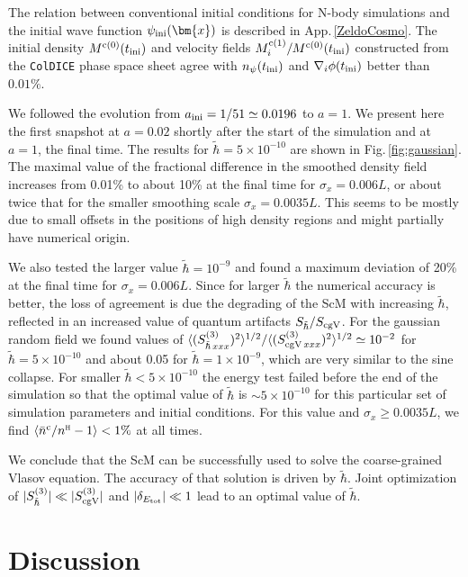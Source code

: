 \documentclass[twocolumn, nofootinbib, showpacs, superscriptaddress]{revtex4-1}
\renewcommand{\H}[0]{{\textsc{h}}}
\newcommand{\sigx}{{\sigma_{\! x}}}
\newcommand{\thbar}{\tilde\hbar}
\renewcommand{\c}[0]{{\rm{c}}}
\newcommand{\vx}[0]{\bm{x} }
\begin{document}
The relation between conventional initial conditions for N-body simulations and the initial wave function $\psi_{\rm ini}(\vx)$ is 
described in App.\,\ref{ZeldoCosmo}.  The initial density $M^{\c(0)}(t_{\rm ini})$ and velocity fields $M^{\c(1)}_i/M^{\c(0)}(t_{\rm ini})$ 
constructed from the \texttt{ColDICE} phase space sheet agree with $n_\psi(t_{\rm ini})$ and $\nabla_i \phi(t_{\rm ini})$ better than $0.01\%$.

We followed the evolution from $a_{\rm ini}=1/51\simeq 0.0196$ to $a=1$. We present here the first snapshot at $a=0.02$ shortly after the start
 of the simulation and at $a=1$, the final time.  The results for $\thbar=5\times10^{-10}$ are shown in Fig.\,\ref{fig:gaussian}.
The maximal value of the fractional difference in the smoothed density field increases from 0.01\% to about 10\% at the final time for $\sigx=0.006 L$, or about twice that 
for the smaller smoothing scale $\sigx=0.0035 L$. This seems to be mostly due to small offsets in the positions of high density regions and might partially 
have numerical origin. 

We also tested the larger value $\thbar=10^{-9}$ and found a maximum deviation of 20\% at the final time for $\sigx=0.006 L$. 
Since for larger $\thbar$ the numerical accuracy is better, the loss of agreement is due the degrading of the ScM with increasing $\thbar$,
 reflected in an increased value of quantum artifacts $S_{\thbar}/S_{\rm cg V}$. 
 For the gaussian random field we found values of  $\langle (S^{(3)}_{\thbar\,xxx})^2 \rangle^{1/2}/\langle (S^{(3)}_{{\rm cg V}\,xxx})^2\rangle^{1/2} \simeq 10^{-2}$ for $\thbar=5\times10^{-10}$ and about 0.05 for $\thbar=1\times10^{-9}$, which are  very similar to the sine collapse.
For smaller $\thbar < 5\times10^{-10}$ the energy test failed before the end of the simulation
so that the optimal value of $\thbar$ is $\sim 5\times10^{-10}$ for this particular set of simulation parameters and initial conditions. For this value and $\sigx\geq 0.0035 L$, we find $\langle \bar n^\c/n^\H -1 \rangle < 1\%$ at all times.


We conclude that the ScM can be successfully used to solve the coarse-grained Vlasov equation. The accuracy of that solution is driven by $\thbar$. Joint optimization of $  |S^{(3)}_{\thbar}| \ll |S^{(3)}_{\rm cg V}| $ and $|\delta_{E_{\rm tot}} | \ll 1 $ lead to an optimal value of $\thbar$.


\section{Discussion} \label{sec:Discussion}
\end{document}
